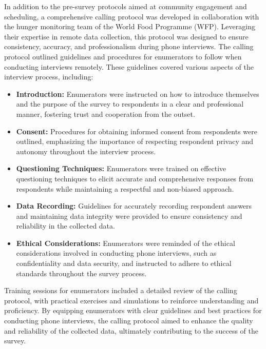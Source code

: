 \documentclass[11pt,harvard]{article}
\begin{document}
In addition to the pre-survey protocols aimed at community engagement and scheduling, a comprehensive calling protocol was developed in collaboration with the hunger monitoring team of the World Food Programme (WFP). Leveraging their expertise in remote data collection, this protocol was designed to ensure consistency, accuracy, and professionalism during phone interviews. The calling protocol outlined guidelines and procedures for enumerators to follow when conducting interviews remotely. These guidelines covered various aspects of the interview process, including:
\begin{itemize}[label=--, left=2.75em]
	\item[1.]\textbf{Introduction:} Enumerators were instructed on how to introduce themselves and the purpose of the survey to respondents in a clear and professional manner, fostering trust and cooperation from the outset.

	\item[2.]\textbf{Consent:} Procedures for obtaining informed consent from respondents were outlined, emphasizing the importance of respecting respondent privacy and autonomy throughout the interview process.

	\item[3.]\textbf{Questioning Techniques:} Enumerators were trained on effective questioning techniques to elicit accurate and comprehensive responses from respondents while maintaining a respectful and non-biased approach.

	\item[4.]\textbf{Data Recording:} Guidelines for accurately recording respondent answers and maintaining data integrity were provided to ensure consistency and reliability in the collected data.

	\item[5.]\textbf{Ethical Considerations:} Enumerators were reminded of the ethical considerations involved in conducting phone interviews, such as confidentiality and data security, and instructed to adhere to ethical standards throughout the survey process.
\end{itemize}

Training sessions for enumerators included a detailed review of the calling protocol, with practical exercises and simulations to reinforce understanding and proficiency. By equipping enumerators with clear guidelines and best practices for conducting phone interviews, the calling protocol aimed to enhance the quality and reliability of the collected data, ultimately contributing to the success of the survey.
\end{document}
